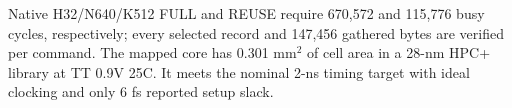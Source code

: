 Native H32/N640/K512 FULL and REUSE require 670,572 and 115,776 busy cycles, respectively; every selected record and 147,456 gathered bytes are verified per command. The mapped core has 0.301 mm$^2$ of cell area in a 28-nm HPC+ library at TT 0.9V 25C. It meets the nominal 2-ns timing target with ideal clocking and only 6 fs reported setup slack.
